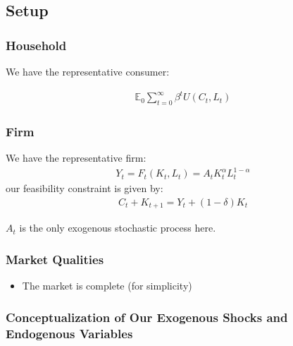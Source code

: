 \documentclass[10pt]{article}
\begin{document}
\subsection{Setup}

\subsubsection{Household}

We have the representative consumer:

\begin{align}
    \mathbb{E}_0 \sum_{t=0}^{\infty} \beta^t U\left(C_t, L_t\right)
\end{align}




\subsubsection{Firm}

We have the representative firm:
\begin{align}
    Y_t=F_t\left(K_t, L_t\right)=A_t K_t^\alpha L_t^{1-\alpha}
\end{align}
our feasibility constraint is given by:
\begin{align}
    C_t+K_{t+1}=Y_t+(1-\delta) K_t
\end{align}

$A_t$ is the only exogenous stochastic process here.




\subsubsection{Market Qualities}

\begin{itemize}
    \item The market is complete (for simplicity)
\end{itemize}


\subsubsection{Conceptualization of Our Exogenous Shocks and Endogenous Variables}
\end{document}
